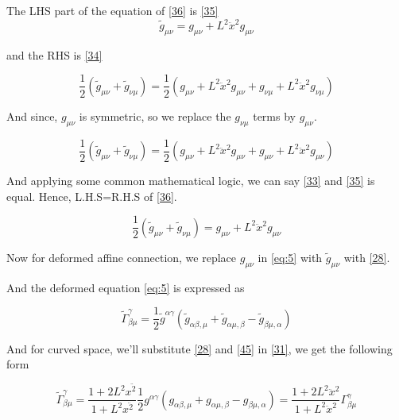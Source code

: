 \documentclass{article}
\begin{document}
The LHS part of the equation of \eqref{36} is \eqref{35}
\begin{equation}
    \tilde{g}_{\mu\nu}=g_{\mu\nu} + L^2 \ddot{x}^2 g_{\mu\nu}
    \label{35}
\end{equation}

and the RHS is \eqref{34}

\begin{equation}
        \frac{1}{2} (\tilde{g}_{\mu\nu} + \tilde{g}_{\nu\mu})=\frac{1}{2} (g_{\mu\nu} + L^2 \ddot{x}^2 g_{\mu\nu} + g_{\nu\mu} + L^2 \ddot{x}^2 g_{\nu\mu})
        \label{34}
\end{equation}

And since, $g_{\mu\nu}$ is symmetric, so we replace the $g_{\nu\mu}$ terms by $g_{\mu\nu}$.


\begin{equation}
    \frac{1}{2} (\tilde{g}_{\mu\nu} + \tilde{g}_{\nu\mu})=\frac{1}{2} (g_{\mu\nu} + L^2 \ddot{x}^2 g_{\mu\nu} + g_{\mu\nu} + L^2 \ddot{x}^2 g_{\mu\nu})
     \label{33}
\end{equation}

And applying some common mathematical logic, we can say \eqref{33} and \eqref{35} is equal. Hence, L.H.S=R.H.S of \eqref{36}.

\begin{equation}
    \frac{1}{2} (\tilde{g}_{\mu\nu} + \tilde{g}_{\nu\mu}) = g_{\mu\nu} + L^2 \ddot{x}^2 g_{\mu\nu}
\label{32}
\end{equation}

Now for deformed affine connection, we replace $g_{\mu\nu}$ in \eqref{eq:5} with $\tilde{g}_{\mu\nu}$ with \eqref{28}. 

And the deformed equation \eqref{eq:5} is expressed as

\begin{equation}
  \tilde{\Gamma}^{\gamma}_{\beta\mu} = \frac{1}{2} \widetilde{g}^{\alpha\gamma} \left(\widetilde{g}_{\alpha\beta,\mu} + \widetilde{g}_{\alpha\mu,\beta} - \widetilde{g}_{\beta\mu,\alpha} \right)
\label{31}
\end{equation}

And for curved space, we'll substitute \eqref{28} and \eqref{45} in \eqref{31}, we get the following form

\begin{equation}
    \tilde{\Gamma}^{\gamma}_{\beta\mu} = \frac{1 + 2L^2x\ddot{^2}}{1 + L^2x\ddot{^2}}  \frac{1}{2}g^{\alpha\gamma}\left(g_{\alpha\beta,\mu} + g_{\alpha\mu,\beta}-g_{\beta\mu,\alpha} \right)=\frac{1 + 2L^2 \ddot{x}^2}{1 + L^2 \ddot{x}^2} \Gamma^{\gamma}_{\beta \mu}
\label{27}
\end{equation}
\end{document}
